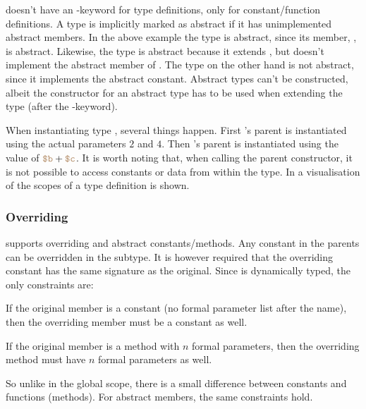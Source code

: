 
\productname{} doesn't have an -keyword for type definitions, only
for constant/function definitions. A type is implicitly marked as abstract if it has
unimplemented abstract members. In the above example the type  is abstract,
since its member, , is abstract. Likewise, the type
 is abstract because it extends , but doesn't implement the abstract
member of . The type  on the other hand is not abstract, since it
implements the abstract constant. Abstract types can't be constructed, albeit the
constructor for an abstract type has to be used when extending the type (after the
-keyword).

When instantiating type , several things happen. First 's parent
is instantiated using the actual parameters $2$ and $4$. Then 's parent
is instantiated using the value of $\variable{b} + \variable{c}$. It is worth
noting that, when calling the parent constructor, it is not possible to access
constants or data from within the type. In  a
visualisation of the scopes of a type definition is shown.


\subsubsection{Overriding}

\productname{} supports overriding and abstract constants/methods. Any constant
in the parents can be overridden in the subtype. It is however required that the
overriding constant has the same signature as the original. Since
\productname{} is dynamically typed, the only constraints are:
\begin{nlist}
\item If the original member is a constant (no formal parameter list after the name),
  then the overriding member must be a constant as well.
\item If the original member is a method with $n$ formal parameters, then the
  overriding method must have $n$ formal parameters as well.
\end {nlist}
So unlike in the global scope, there is a small difference between constants and
functions (methods). For abstract members, the same constraints hold.

